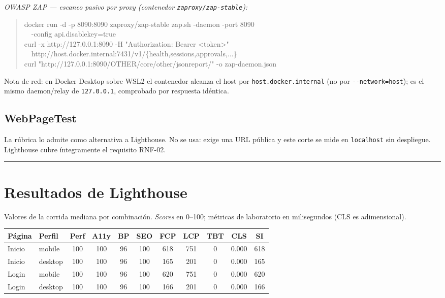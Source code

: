 \documentclass[11pt]{article}
\newcommand{\regla}{\noindent\textcolor{linea}{\rule{\linewidth}{0.4pt}}}
\begin{document}
\noindent\textit{OWASP ZAP — escaneo pasivo por proxy (contenedor \texttt{zaproxy/zap-stable}):}
\begin{quote}\ttfamily\scriptsize\raggedright
docker run -d -p 8090:8090 zaproxy/zap-stable zap.sh -daemon -port 8090 \\
\ \ -config api.disablekey=true \\
curl -x http://127.0.0.1:8090 -H "Authorization: Bearer <token>" \\
\ \ http://host.docker.internal:7431/v1/\{health,sessions,approvals,...\} \\
curl "http://127.0.0.1:8090/OTHER/core/other/jsonreport/" -o zap-daemon.json
\end{quote}

\noindent Nota de red: en Docker Desktop sobre WSL2 el contenedor alcanza el host
por \texttt{host.docker.internal} (no por \texttt{-{}-network=host}); es el mismo
daemon/relay de \texttt{127.0.0.1}, comprobado por respuesta idéntica.

\subsection{WebPageTest}
La rúbrica lo admite como alternativa a Lighthouse. No se usa: exige una URL
pública y este corte se mide en \texttt{localhost} sin despliegue. Lighthouse
cubre íntegramente el requisito RNF-02.

\regla

\section{Resultados de Lighthouse}
Valores de la corrida mediana por combinación. \emph{Scores} en 0--100; métricas
de laboratorio en milisegundos (CLS es adimensional).

\medskip
\begin{center}\footnotesize
\begin{tabular}{@{}l l *{9}{c}@{}}
\toprule
\textbf{Página} & \textbf{Perfil} & \textbf{Perf} & \textbf{A11y} & \textbf{BP} & \textbf{SEO} & \textbf{FCP} & \textbf{LCP} & \textbf{TBT} & \textbf{CLS} & \textbf{SI} \\
\midrule
Inicio & mobile & 100 & 100 & 96 & 100 & 618 & 751 & 0 & 0.000 & 618 \\
Inicio & desktop & 100 & 100 & 96 & 100 & 165 & 201 & 0 & 0.000 & 165 \\
Login & mobile & 100 & 100 & 96 & 100 & 620 & 751 & 0 & 0.000 & 620 \\
Login & desktop & 100 & 100 & 96 & 100 & 166 & 201 & 0 & 0.000 & 166 \\
\bottomrule
\end{tabular}
\end{center}
\normalsize
\end{document}

